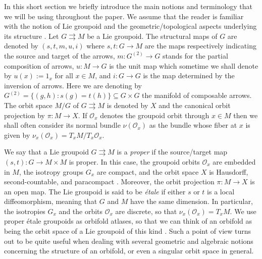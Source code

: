 \documentclass[
  a4paper, 
  reqno, 
  oneside, 
  12pt
]{amsart}
\theoremstyle{definition}
\theoremstyle{remark}
\newcommand{\rr}{\rightrightarrows}
\begin{document}
In this short section we briefly introduce the main notions and terminology that we will be using throughout the paper. We assume that the reader is familiar with the notion of Lie groupoid and the geometric/topological aspects underlying its structure \cite{dH,MoMr0}. Let $G\rr M$ be a Lie groupoid. The structural maps of $G$ are denoted by $(s,t,m,u,i)$ where $s,t:G\to M$ are the maps respectively indicating the source and target of the arrows, $m:G^{(2)}\to G$ stands for the partial composition of arrows, $u:M\to G$ is the unit map which sometime we shall denote by $u(x):=1_x$ for all $x\in M$, and $i:G\to G$ is the map determined by the 
inversion of arrows. Here we are denoting by $G^{(2)}=\lbrace (g,h): s(g)=t(h)\rbrace\subseteq G\times G$ the manifold of composable arrows. The orbit space $M/G$ of $G\rr M$ is denoted by $X$ and the canonical orbit projection by $\pi:M\to X$. If $\mathcal{O}_x$ denotes the groupoid orbit through $x\in M$ then we shall often consider its normal bundle $\nu(\mathcal{O}_x)$ as the bundle whose fiber at $x$ is given by $\nu_x(\mathcal{O}_x)=T_xM/T_x\mathcal{O}_x$.

We say that a Lie groupoid $G\rr M$ is a \emph{proper} if the source/target map $(s,t):G\to M\times M$ is proper. In this case, the groupoid orbits $\mathcal{O}_x$ are embedded in $M$, the isotropy groups $G_x$ are compact, and the orbit space $X$ is Hausdorff, second-countable, and paracompact \cite{dH}. Moreover, the orbit projection $\pi:M\to X$ is an open map. The Lie groupoid is said to be \emph{étale} if either $s$ or $t$ is a local diffeomorphism, meaning that $G$ and $M$ have the same dimension. In particular, the isotropies $G_x$ and the orbits $\mathcal{O}_x$ are discrete, so that $\nu_x(\mathcal{O}_x)=T_xM$. We use proper étale groupoids as orbifold atlases, so that we can think of an orbifold as being the orbit space of a Lie groupoid of this kind \cite{BX,Ler}. Such a point of view turns out to be quite useful when dealing with several geometric and algebraic notions concerning the structure of an orbifold, or even a singular orbit space in general.
\end{document}
